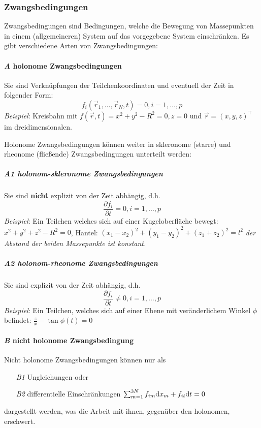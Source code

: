 \subsubsection{Zwangsbedingungen} 
Zwangsbedingungen sind Bedingungen, welche die Bewegung von Massepunkten in einem (allgemeineren) System auf das vorgegebene System einschränken. Es gibt verschiedene Arten von Zwangsbedingungen:

\paragraph{\textit{A} holonome Zwangsbedingungen} Sie sind Verknüpfungen der Teilchenkoordinaten und eventuell der
Zeit in folgender Form: $$f_i(\vec{r}_1, \dots, \vec{r}_N, t) = 0, i = 1, \dots, p$$ 
\emph{Beispiel}: Kreisbahn mit $f(\vec{r}, t) = x^2 + y^2 - R^2 = 0, z = 0$ und $\vec{r} = (x,y,z)^\top$ im dreidimensionalen.

Holonome Zwangsbedingungen können weiter in skleronome (starre) und rheonome (fließende) Zwangsbedingungen unterteilt werden:

\subparagraph{\textit{A1} holonom-skleronome Zwangsbedingungen} Sie sind \textbf{nicht} explizit von der Zeit abhängig, d.h.
$$ \frac{\partial f_i}{\partial t} = 0, i = 1, \dots, p$$
\emph{Beispiel}: Ein Teilchen welches sich auf einer Kugeloberfläche bewegt: $x^2 + y^2 + z^2 - R^2 = 0$, Hantel: $(x_1 - x_2)^2 + (y_1 - y_2)^2 + (z_1 + z_2)^2 = l^2$ \textit{der Abstand der beiden Massepunkte ist konstant.}

\subparagraph{\textit{A2} holonom-rheonome Zwangsbedingungen} Sie sind explizit von der Zeit abhängig, d.h.
$$ \frac{\partial f_i}{\partial t} \neq 0, i = 1, \dots, p$$
\emph{Beispiel}: Ein Teilchen, welches sich auf einer Ebene mit veränderlichem Winkel $\phi$ befindet: $\frac{z}{x} - \tan{\phi(t)} = 0$


\paragraph{\textit{B} nicht holonome Zwangsbedingung}
Nicht holonome Zwangsbedingungen können nur als 
\begin{itemize}
	\item[\textit{B1}] Ungleichungen oder
	\item[\textit{B2}] differentielle Einschränkungen
	$ \sum_{m = 1}^{3N} f_{im} \mathrm d x_m + f_{it} \mathrm d t = 0$
\end{itemize}
dargestellt werden, was die Arbeit mit ihnen, gegenüber den holonomen, erschwert. 

